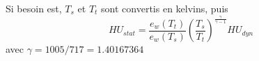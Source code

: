 Si besoin est, $T_s$ et $T_t$ sont convertis en kelvins, puis
\[
HU_{stat} = 
\frac{e_w(T_t)}{e_w(T_s)}
\left(\frac{T_s}{T_t}\right)^{\frac{\gamma}{\gamma-1}}
HU_{dyn}
\]
avec $\gamma =  1005/717 = 1.40167364$
